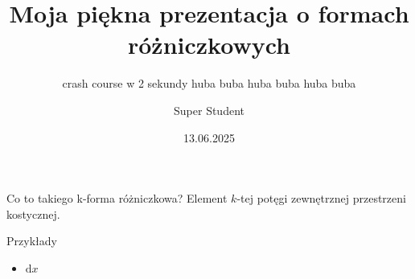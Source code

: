 \documentclass{beamer}
\title{Moja piękna prezentacja o formach różniczkowych}
\subtitle{crash course w 2 sekundy huba buba huba buba huba buba}
\author{Super Student}
\date{13.06.2025}
\begin{document}
\begin{frame}
  \titlepage
\end{frame}

\begin{frame}{Co to takiego k-forma różniczkowa?}
  Element $k$-tej potęgi zewnętrznej przestrzeni kostycznej.

  Przykłady
  \begin{itemize}
    \item $\text{d}x$
  \end{itemize}
\end{frame}
\end{document}
